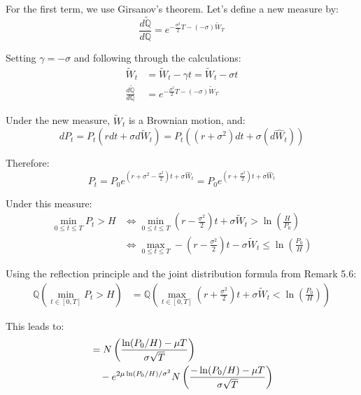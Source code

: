 \documentclass{article}
\begin{document}
For the first term, we use Girsanov's theorem. Let's define a new measure by:
\begin{equation}
\frac{d\tilde{\mathbb{Q}}}{d\mathbb{Q}} = e^{-\frac{\sigma^2}{2}T - (-\sigma)\tilde{W}_T}
\end{equation}

Setting $\gamma = -\sigma$ and following through the calculations:
\begin{align}
\tilde{W}_t &= \tilde{W}_t - \gamma t = \tilde{W}_t - \sigma t\\
\frac{d\tilde{\mathbb{Q}}}{d\mathbb{Q}} &= e^{-\frac{\sigma^2}{2}T - (-\sigma)\tilde{W}_T}
\end{align}

Under the new measure, $\tilde{W}_t$ is a Brownian motion, and:
\begin{equation}
dP_t = P_t(rdt + \sigma d\tilde{W}_t) = P_t((r + \sigma ^2)dt + \sigma (d\hat{W}_t)) 
\end{equation}

Therefore:
\begin{equation}
P_t = P_0 e^{(r + \sigma^2 - \frac{\sigma^2}{2})t + \sigma\hat{W}_t} = P_0 e^{(r + \frac{\sigma^2}{2})t + \sigma\hat{W}_t}
\end{equation}

Under this measure:
\begin{align}
\min_{0 \leq t \leq T} P_t > H &\Leftrightarrow \min_{0 \leq t \leq T} \left(r - \frac{\sigma^2}{2}\right)t + \sigma\tilde{W}_t > \ln\left(\frac{H}{P_0}\right)\\
&\Leftrightarrow \max_{0 \leq t \leq T} -\left(r - \frac{\sigma^2}{2}\right)t - \sigma\tilde{W}_t \leq \ln\left(\frac{P_0}{H}\right)
\end{align}

Using the reflection principle and the joint distribution formula from Remark 5.6:
\begin{align}
\mathbb{Q}\left(\min_{t \in [0,T]} P_t > H\right) &= \mathbb{Q}\left(\max_{t \in [0,T]} \left(r + \frac{\sigma^2}{2}\right)t + \sigma\tilde{W}_t < \ln\left(\frac{P_0}{H}\right)\right)
\end{align}

This leads to:
\begin{align}
&= N\left(\frac{\ln(P_0/H) - \mu T}{\sigma\sqrt{T}}\right) \notag\\
&\quad - e^{2\mu\ln(P_0/H)/\sigma^2} N\left(\frac{-\ln(P_0/H) - \mu T}{\sigma\sqrt{T}}\right)
\end{align}
\end{document}
